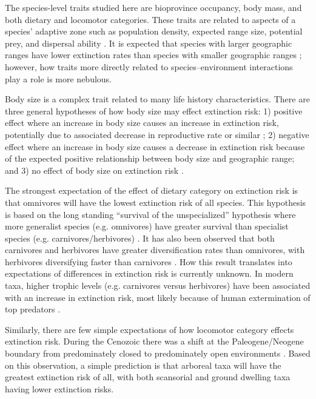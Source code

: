 \documentclass[12pt]{article}
\begin{document}
The species-level traits studied here are bioprovince occupancy, body mass, and both dietary and locomotor categories. These traits are related to aspects of a species' adaptive zone such as population density, expected range size, potential prey, and dispersal ability \cite{Smith2004,Jernvall2004}. It is expected that species with larger geographic ranges have lower extinction rates than species with smaller geographic ranges \cite{Jablonski1986,Roy2009c}; however, how traits more directly related to species--environment interactions play a role is more nebulous.

Body size is a complex trait related to many life history characteristics. There are three general hypotheses of how body size may effect extinction risk: 1) positive effect where an increase in body size causes an increase in extinction risk, potentially due to associated decrease in reproductive rate or similar \cite{Liow2008,Liow2009}; 2) negative effect where an increase in body size causes a decrease in extinction risk because of the expected positive relationship between body size and geographic range; and 3) no effect of body size on extinction risk \cite{Tomiya2013}. 

The strongest expectation of the effect of dietary category on extinction risk is that omnivores will have the lowest extinction risk of all species. This hypothesis is based on the long standing ``survival of the unspecialized'' hypothesis where more generalist species (e.g. omnivores) have greater survival than specialist species (e.g. carnivores/herbivores) \cite{Liow2004a,Simpson1944}. It has also been observed that both carnivores and herbivores have greater diversification rates than omnivores, with herbivores diversifying faster than carnivores \cite{Price2012}. How this result translates into expectations of differences in extinction risk is currently unknown. In modern taxa, higher trophic levels (e.g. carnivores versus herbivores) have been associated with an increase in extinction risk, most likely because of human extermination of top predators \cite{Liow2009,Purvis2000a}. 

Similarly, there are few simple expectations of how locomotor category effects extinction risk. During the Cenozoic there was a shift at the Paleogene/Neogene boundary from predominately closed to predominately open environments \cite{Blois2009,Janis1993a}. Based on this observation, a simple prediction is that arboreal taxa will have the greatest extinction risk of all, with both scansorial and ground dwelling taxa having lower extinction risks. 
\end{document}
